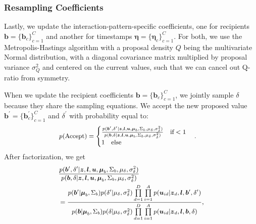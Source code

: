 \documentclass[twoside]{article}
\begin{document}
  	  \subsubsection{Resampling Coefficients}  \label{subsubsec: Resampling Coefficients}
  Lastly, we update the interaction-pattern-specific coefficients, one for recipients $\boldsymbol{b} =\{\boldsymbol{b}_c\}_{c=1}^C$ and another for timestamps $\boldsymbol{\eta} =\{\boldsymbol{\eta}_c\}_{c=1}^C$.
  	  For both, we use the Metropolis-Hastings algorithm with a proposal
density $Q$ being the multivariate Normal distribution, with a diagonal covariance matrix multiplied by proposal variance $\sigma^2_Q$ and centered on the current values, such that we can cancel out Q-ratio from symmetry.

When we update the recipient coefficients $\boldsymbol{b} =\{\boldsymbol{b}_c\}_{c=1}^C$, we jointly sample $\delta$ because they share the sampling equations. We accept the new proposed value $\boldsymbol{b}^\prime =\{\boldsymbol{b}^\prime_c\}_{c=1}^C$ and $\delta^\prime$ with probability equal to:
   \begin{equation*}
     	 \footnotesize
   \begin{split}
   & p(\mbox{Accept})=
   \begin{cases}  \frac{p(\boldsymbol{b}^\prime, \delta^\prime|\boldsymbol{z},  \boldsymbol{l},\boldsymbol{u},  \boldsymbol{\mu}_b, \Sigma_b, \mu_\delta, \sigma^2_\delta)}{p(\boldsymbol{b}, \delta|\boldsymbol{z},  \boldsymbol{l},\boldsymbol{u},  \boldsymbol{\mu}_b, \Sigma_b, \mu_\delta, \sigma^2_\delta)}\quad\text{if}  <1\\
   1 \quad \text{else}
   \end{cases}.
   \end{split}
   \end{equation*}
   After factorization, we get 
     	     \begin{equation*}
     	    \footnotesize
     	     \begin{aligned} 
     	     &\frac{p(\boldsymbol{b}^\prime, \delta^\prime|\boldsymbol{z},  \boldsymbol{l},\boldsymbol{u},  \boldsymbol{\mu}_b, \Sigma_b, \mu_\delta, \sigma^2_\delta)}{p(\boldsymbol{b}, \delta|\boldsymbol{z},  \boldsymbol{l},\boldsymbol{u},  \boldsymbol{\mu}_b, \Sigma_b, \mu_\delta, \sigma^2_\delta)}
     	     \\& = \frac{p(\boldsymbol{b}^\prime|\boldsymbol{\mu}_b, \Sigma_b) p(\delta^\prime|\mu_\delta, \sigma^2_\delta)\prod\limits_{d=1}^D\prod\limits_{i=1}^A p(\boldsymbol{u}_{id}| \boldsymbol{z}_d,  \boldsymbol{l}, \boldsymbol{b}^\prime, \delta^\prime)}{p(\boldsymbol{b}|\boldsymbol{\mu}_b, \Sigma_b) p(\delta|\mu_\delta, \sigma^2_\delta)\prod\limits_{d=1}^D\prod\limits_{i=1}^A p(\boldsymbol{u}_{id}| \boldsymbol{z}_d,  \boldsymbol{l}, \boldsymbol{b}, \delta)},
     	        \end{aligned}
     	    \end{equation*}
\end{document}
